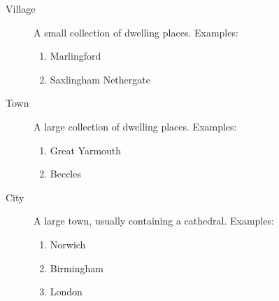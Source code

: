 \documentclass[12pt]{scrartcl}
\begin{document}
\begin{description}
    \item[Village] A small collection of dwelling places. Examples:
        \begin{enumerate}
            \item Marlingford
            \item Saxlingham Nethergate
        \end{enumerate}
    \item[Town] A large collection of dwelling places. Examples:
        \begin{enumerate}
            \item Great Yarmouth
            \item Beccles
        \end{enumerate}
    \item[City] A large town, usually containing a cathedral. Examples:
        \begin{enumerate}
            \item Norwich
            \item Birmingham
            \item London
        \end{enumerate}
\end{description}
\end{document}
